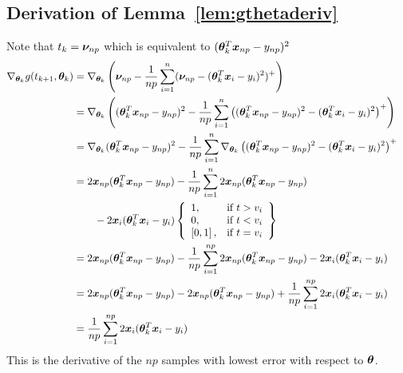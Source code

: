 \documentclass{article} %
\begin{document}
\begin{appendices}
	\subsection{Derivation of Lemma~\ref{lem:gthetaderiv}}
	\label{app:gthetaderiv}
		Note that $t_k = {\bm{\nu}}_{np}$ which is equivalent to $({\bm{\theta}}_k^T{\bm{x}}_{np} - y_{np})^2$
		\begin{align*}
			\nabla_{{\bm{\theta}}_k} g(t_{k+1},{\bm{\theta}}_k) &= \nabla_{{\bm{\theta}}_k}\left({\bm{\nu}}_{np} - \frac{1}{np}\sum_{i=1}^n({\bm{\nu}}_{np} - ({\bm{\theta}}_k^T{\bm{x}}_i - y_i)^2)^+\right) &&\\
			&= \nabla_{{\bm{\theta}}_k}\left(({\bm{\theta}}_k^T{\bm{x}}_{np}-y_{np})^2 - \frac{1}{np}\sum_{i=1}^n\left(({\bm{\theta}}_k^T{\bm{x}}_{np} - y_{np})^2 - ({\bm{\theta}}_k^T{\bm{x}}_i - y_i)^2\right)^+\right) &&\\
			&= \nabla_{{\bm{\theta}}_k}({\bm{\theta}}_k^T{\bm{x}}_{np}-y_{np})^2 - \frac{1}{np}\sum_{i=1}^n\nabla_{{\bm{\theta}}_k}\left(({\bm{\theta}}_k^T{\bm{x}}_{np} - y_{np})^2 - ({\bm{\theta}}_k^T{\bm{x}}_i - y_i)^2\right)^+ &&\\				
			&= 2{\bm{x}}_{np}({\bm{\theta}}_k^T{\bm{x}}_{np} - y_{np}) -\frac{1}{np}\sum_{i=1}^{n}2{\bm{x}}_{np}({\bm{\theta}}_k^T{\bm{x}}_{np} - y_{np}) \notag\\ &\qquad-2{\bm{x}}_i({\bm{\theta}}_k^T{\bm{x}}_i - y_i) \left\{
			\begin{array}{lr}
				1, & \text{if } t > v_i\\
				0, & \text{if } t < v_i \\
				\left[0,1\right], & \text{if } t = v_i \\
			\end{array} \right\} &&\\
			&= 2{\bm{x}}_{np}({\bm{\theta}}_k^T{\bm{x}}_{np} - y_{np}) -\frac{1}{np}\sum_{i=1}^{np}2{\bm{x}}_{np}({\bm{\theta}}_k^T{\bm{x}}_{np} - y_{np}) -2{\bm{x}}_i({\bm{\theta}}_k^T{\bm{x}}_i - y_i) &&\\	
			&= 2{\bm{x}}_{np}({\bm{\theta}}_k^T{\bm{x}}_{np} - y_{np}) - 2{\bm{x}}_{np}({\bm{\theta}}_k^T{\bm{x}}_{np} - y_{np}) + \frac{1}{np}\sum_{i=1}^{np}2{\bm{x}}_i({\bm{\theta}}_k^T{\bm{x}}_i - y_i) &&\\
			&= \frac{1}{np}\sum_{i=1}^{np}2{\bm{x}}_i({\bm{\theta}}_k^T{\bm{x}}_i - y_i)&&
		\end{align*}
		This is the derivative of the $np$ samples with lowest error with respect to ${\bm{\theta}}$.


\end{appendices}
\end{document}
